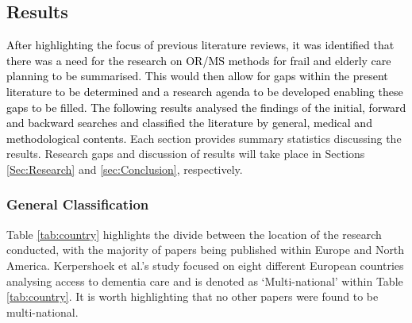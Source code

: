 \documentclass[../thesis.tex]{subfiles}
\begin{document}
\subsection{Results} \label{sec:Classification} 
\textcolor{black}{After highlighting the focus of previous literature reviews, it was identified that there was a need for the research on OR/MS methods for frail and elderly care planning to be summarised. This would then allow for gaps within the present literature to be determined and a research agenda to be developed enabling these gaps to be filled. The following results analysed the findings of the initial, forward and backward searches and classified the literature by general, medical and methodological contents.} Each section provides summary statistics discussing the results. Research gaps and discussion of results will take place in Sections \ref{Sec:Research} and \ref{sec:Conclusion}, respectively.

\subsubsection{General Classification}
Table \ref{tab:country} highlights the divide between the location of the research conducted, with the majority of papers being published within Europe and North America. Kerpershoek et al.'s \cite{Kerpershoek} study focused on eight different European countries analysing access to dementia care and is denoted as `Multi-national' within Table \ref{tab:country}. It is worth highlighting that no other papers were found to be multi-national.
\end{document}
